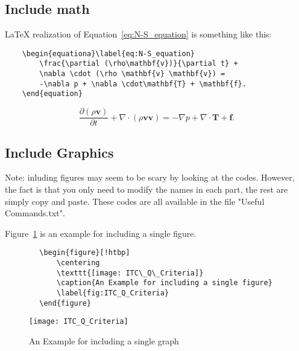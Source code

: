 
\subsection{Include math} %
\LaTeX{} realization of Equation~\ref{eq:N-S_equation} is something like this:
\begin{center}
    \small
    \begin{verbatim}
    \begin{equationa}\label{eq:N-S_equation}
        \frac{\partial (\rho\mathbf{v})}{\partial t} +
        \nabla \cdot (\rho \mathbf{v} \mathbf{v}) =
        -\nabla p + \nabla \cdot\mathbf{T} + \mathbf{f}. 
    \end{equation}    
\end{verbatim}
\end{center}

\begin{equation}\label{eq:N-S_equation}
    \frac{\partial (\rho\mathbf{v})}{\partial t} + \nabla \cdot (\rho \mathbf{v} \mathbf{v}) = -\nabla p + \nabla \cdot\mathbf{T} + \mathbf{f}. 
\end{equation}    

\subsection{Include Graphics} %
Note: inluding figures may seem to be scary by looking at the codes. However, the fact is that you only need to modify the names in each part, the rest are simply copy and paste. These codes are all available in the file "Useful Commands.txt".

Figure~\ref{fig:ITC_Q_Criteria} is an example for including a single figure.
\begin{center}
    \small
    \begin{verbatim}
        \begin{figure}[!htbp]
            \centering
            \texttt{[image: ITC\_Q\_Criteria]}
            \caption{An Example for including a single figure}
            \label{fig:ITC_Q_Criteria}
        \end{figure}
    \end{verbatim}
\end{center}

\begin{figure}[!htbp]
    \centering
    \texttt{[image: ITC\_Q\_Criteria]}
    \caption{An Example for including a single graph}
    \label{fig:ITC_Q_Criteria}
\end{figure}


